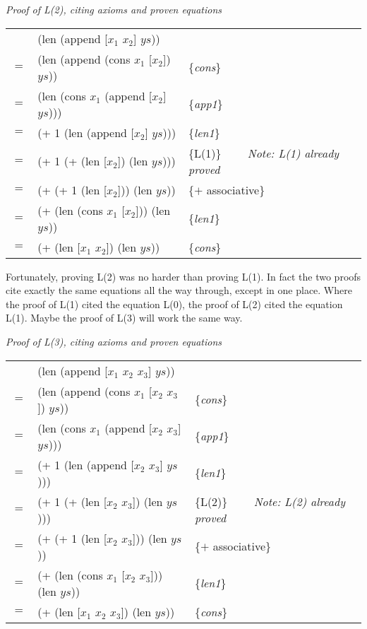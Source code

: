 \begin{center}
\emph{Proof of L(2), citing axioms and proven equations}\\
\begin{tabular}{lll}
    & (len (append [$x_1$ $x_2$] $ys$))         &                     \\
$=$ & (len (append (cons $x_1$ [$x_2$]) $ys$))  & \{\emph{cons}\}     \\
$=$ & (len (cons $x_1$ (append [$x_2$] $ys$)))  & \{\emph{app1}\}     \\
$=$ & (+ 1 (len (append [$x_2$] $ys$)))         & \{\emph{len1}\}     \\
$=$ & (+ 1 (+ (len [$x_2$]) (len $ys$)))        & \{L(1)\} ~~~~\emph{Note: L(1) already proved}\\
$=$ & (+ (+ 1 (len [$x_2$])) (len $ys$))        & \{$+$ associative\} \\
$=$ & (+ (len (cons $x_1$ [$x_2$])) (len $ys$)) & \{\emph{len1}\}     \\
$=$ & (+ (len [$x_1$ $x_2$]) (len $ys$))        & \{\emph{cons}\}     \\
\end{tabular}
\end{center}

Fortunately, proving L(2) was no harder than proving L(1).
In fact the two proofs cite exactly the same equations all the way through,
except in one place.
Where the proof of L(1) cited the equation L(0),
the proof of L(2) cited the equation L(1).
Maybe the proof of L(3) will work the same way.

\begin{center}
\emph{Proof of L(3), citing axioms and proven equations}\\
\begin{tabular}{lll}
    & (len (append [$x_1$ $x_2$ $x_3$] $ys$))         &                     \\
$=$ & (len (append (cons $x_1$ [$x_2$ $x_3$]) $ys$))  & \{\emph{cons}\}     \\
$=$ & (len (cons $x_1$ (append [$x_2$ $x_3$] $ys$)))  & \{\emph{app1}\}     \\
$=$ & (+ 1 (len (append [$x_2$ $x_3$] $ys$)))         & \{\emph{len1}\}     \\
$=$ & (+ 1 (+ (len [$x_2$ $x_3$]) (len $ys$)))        & \{L(2)\} ~~~~\emph{Note: L(2) already proved}\\
$=$ & (+ (+ 1 (len [$x_2$ $x_3$])) (len $ys$))        & \{$+$ associative\} \\
$=$ & (+ (len (cons $x_1$ [$x_2$ $x_3$])) (len $ys$)) & \{\emph{len1}\}     \\
$=$ & (+ (len [$x_1$ $x_2$ $x_3$]) (len $ys$))        & \{\emph{cons}\}     \\
\end{tabular}
\end{center}

